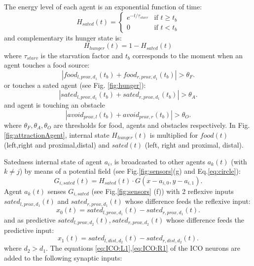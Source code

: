 The energy level of each agent is an exponential function of time:
\begin{equation}
H_{sated}(t)=
  \begin{cases}
   e^{-t/\tau_{starv}} & \text{if } t \geq t_b \\
   0       & \text{if } t < t_b
  \end{cases}
\label{eq:satstate}
\end{equation}
and complementary its hunger state is:
\begin{equation}
H_{hunger}(t)=1-H_{sated}(t)
\end{equation}
where $\tau_{starv}$ is the starvation factor and $t_b$ corresponds to the moment
when an agent touches a food source:
\begin{equation}
|food_{l,prox,d_{1}}(t_{b})+food_{r,prox,d_{1}}(t_{b})|>\theta_{F}.
\label{eq:touchfood}
\end{equation}
or touches a sated agent (see Fig. \ref{fig:hunger}):
\begin{equation}
|sated_{l,prox,d_{1}}(t_{b})+sated_{r,prox,d_{1}}(t_{b})|>\theta_{A}.
\label{eq:touchagent}
\end{equation}
and agent is touching an obstacle
\begin{equation}
|avoid_{prox,l}(t_{b})+avoid_{prox,r}(t_{b})|>\theta_{O}.
\end{equation}
where $\theta_{F},\theta_{A},\theta_{O}$ are thresholds for food, agents and
obstacles respectively.
In Fig. \ref{fig:attractionAgent}, internal state $H_{hunger}(t)$ is multiplied
for $food(t)$ (left,right and proximal,distal) and $sated(t)$ (left, right and proximal, distal).

Satedness internal state of agent $a_{i}$, is broadcasted to other agents
$a_{k}(t)$ (with $k\neq j$) by means of a potential field (see Fig.\ref{fig:sensors}(g) and Eq.\ref{eq:circle}):
\begin{equation}
G_{i,sated}(t)=H_{sated}(t) \cdot G(x-a_{i,0},y-a_{i,1}).
\label{eq:gsated}
\end{equation}
Agent $a_{k}(t)$ senses $G_{i,sated}$ (see Fig.\ref{fig:sensors} (f)) with 2
reflexive inputs $sated_{l,prox,d_{1}}(t)$ and 
$sated_{r,prox,d_{1}}(t)$ whose difference feeds the reflexive input:
\begin{equation}
x_{0}(t)=sated_{l,prox,d_{1}}(t) - sated_{r,prox,d_{1}}(t).
\end{equation}
and as predictive $sated_{l,prox,d_{2}}(t),sated_{r,prox,d_{2}}(t)$ whose
difference feeds the predictive input:
\begin{equation}
x_{1}(t)=sated_{l,dist,d_{2}}(t) - sated_{r,dist,d_{2}}(t).
\label{eq:foodagentpredictive}
\end{equation}
where $d_{2}>d_{1}$.
The equations \ref{eq:ICO:L1},\ref{eq:ICO:R1} of the ICO neurons are added to the
following synaptic inputs:


